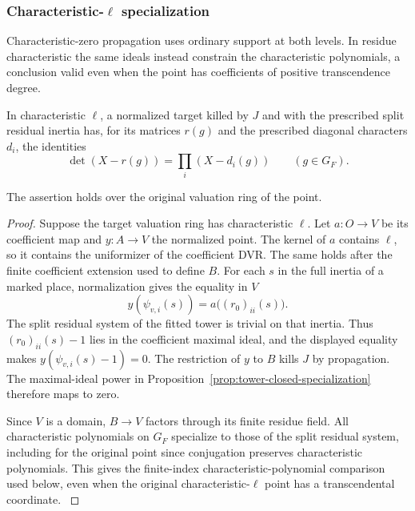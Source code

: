 \subsubsection{Characteristic-\(\ell\) specialization}

Characteristic-zero propagation uses ordinary support at both levels. In residue characteristic the same ideals instead constrain the characteristic polynomials, a conclusion valid even when the point has coefficients of positive transcendence degree.

\begin{proposition}\label{prop:tower-characteristic-ell}
In characteristic \(\ell\), a normalized target killed by \(J\)
and with the prescribed split residual inertia has, for its matrices \(r(g)\) and the prescribed diagonal characters \(d_i\), the identities 
\[
 \det(X-r(g))=\prod_i(X-d_i(g))\qquad(g\in G_F).
\]

The assertion holds over the original valuation ring of the point.
\end{proposition}

\begin{proof}
Suppose the target valuation ring has characteristic \(\ell\).
Let \(a:O\to V\) be its coefficient map and
\(y:A\to V\) the normalized point. The kernel of \(a\)
contains \(\ell\), so it contains the uniformizer of
the coefficient DVR. The same holds after the finite
coefficient extension used to define \(B\).
For each \(s\) in the full inertia of a marked place,
normalization gives the equality in \(V\)
\[
    y(\psi_{v,i}(s))=a\bigl((r_0)_{ii}(s)\bigr).
\]
The split residual system of the fitted tower is trivial on
that inertia. Thus \((r_0)_{ii}(s)-1\) lies in the
coefficient maximal ideal, and the displayed equality makes
\(y(\psi_{v,i}(s)-1)=0\). The restriction of \(y\) to \(B\)
kills \(J\) by propagation. The maximal-ideal power in Proposition~\ref{prop:tower-closed-specialization}
therefore maps to zero.

Since \(V\) is a domain,
\(B\to V\) factors through its finite residue field. All
characteristic polynomials on \(G_F\) specialize to those
of the split residual system, including for the original
point since conjugation preserves characteristic polynomials.
This gives
the finite-index characteristic-polynomial comparison
used below, even when the original characteristic-\(\ell\)
point has a transcendental coordinate.
\label{cor:ordinary-promodularity-13}

\end{proof}








